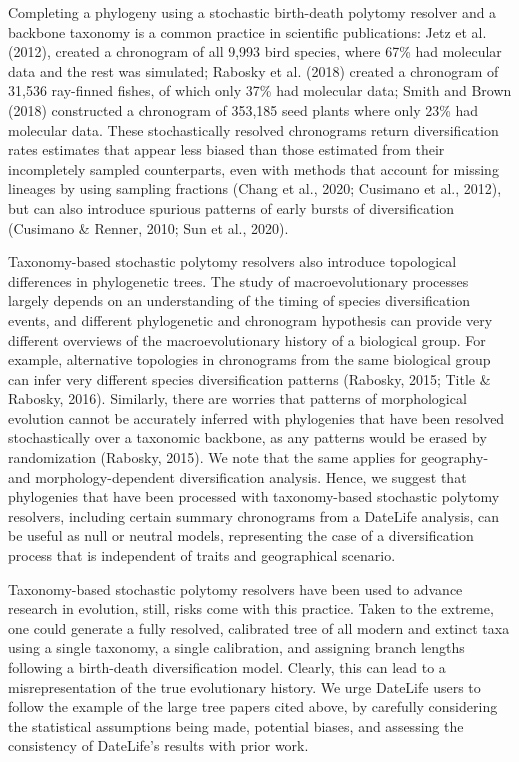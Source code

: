 \documentclass[english,man]{apa6}
\begin{document}
Completing a phylogeny using a stochastic birth-death polytomy resolver and a backbone taxonomy is a common practice in scientific publications: Jetz et al. (2012), created a chronogram of all 9,993 bird species, where 67\% had molecular data and the rest was simulated; Rabosky et al. (2018) created a chronogram of 31,536 ray-finned fishes, of which only 37\% had molecular data; Smith and Brown (2018) constructed a chronogram of 353,185 seed plants where only 23\% had molecular data. These stochastically resolved chronograms return diversification rates estimates that appear less biased than those estimated from their incompletely sampled counterparts, even with methods that account for missing lineages by using sampling fractions (Chang et al., 2020; Cusimano et al., 2012), but can also introduce spurious patterns of early bursts of diversification (Cusimano \& Renner, 2010; Sun et al., 2020).

Taxonomy-based stochastic polytomy resolvers also introduce topological differences in phylogenetic trees.
The study of macroevolutionary processes largely depends on an understanding of the timing of species diversification events, and different phylogenetic and chronogram hypothesis can provide very different overviews of the macroevolutionary history of a biological group.
For example, alternative topologies in chronograms from the same biological group can infer very different species diversification patterns (Rabosky, 2015; Title \& Rabosky, 2016).
Similarly, there are worries that patterns of morphological evolution cannot be accurately inferred with phylogenies that have been resolved stochastically over a taxonomic backbone, as any patterns would be erased by randomization (Rabosky, 2015). We note that the same applies for geography- and morphology-dependent diversification analysis. Hence, we suggest that phylogenies that have been processed with taxonomy-based stochastic polytomy resolvers, including certain summary chronograms from a DateLife analysis, can be useful as null or neutral models, representing the case of a diversification process that is independent of traits and geographical scenario.

Taxonomy-based stochastic polytomy resolvers have been used to advance research in evolution, still, risks come with this practice.
Taken to the extreme, one could generate a fully resolved, calibrated tree of all modern and extinct taxa using a single taxonomy, a single calibration, and assigning branch lengths following a birth-death diversification model. Clearly, this can lead to a misrepresentation of the true evolutionary history.
We urge DateLife users to follow the example of the large tree papers cited above, by carefully considering the statistical assumptions being made, potential biases, and assessing the consistency of DateLife's results with prior work.
\end{document}

